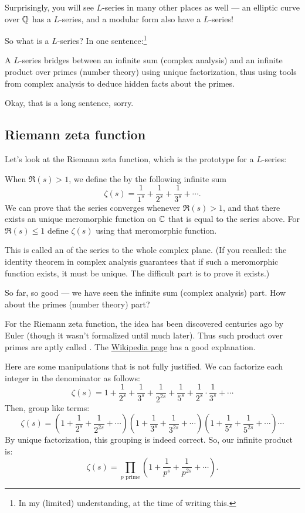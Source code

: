 Surprisingly, you will see $L$-series in many other places as well --- an elliptic curve over $\mathbb Q$
has a $L$-series, and a modular form also have a $L$-series!

So what is a $L$-series? In one sentence:\footnote{In my (limited) understanding, at the time of
writing this.}
\begin{moral}
	A $L$-series bridges between an infinite sum (complex analysis)
	and an infinite product over primes (number theory)
	using unique factorization,
	thus using tools from complex analysis to deduce hidden facts about the primes.
\end{moral}

Okay, that is a long sentence, sorry.

\subsection{Riemann zeta function}

Let's look at the Riemann zeta function, which is the prototype for a $L$-series:

\begin{definition}
	When $\Re(s) > 1$, we define the  by the following infinite sum
	\[ \zeta(s) = \frac{1}{1^s} + \frac{1}{2^s} + \frac{1}{3^s} + \cdots. \]
	We can prove that the series converges whenever $\Re(s) > 1$, and that there exists an unique
	meromorphic function on $\mathbb C$ that is equal to the series above.
	For $\Re(s) \leq 1$ define $\zeta(s)$ using that meromorphic function.
\end{definition}

This is called an  of the series to the whole complex plane.
(If you recalled:
the identity theorem in complex analysis guarantees that if such a meromorphic function exists,
it must be unique. The difficult part is to prove it exists.)

So far, so good --- we have seen the infinite sum (complex analysis) part. How about the primes
(number theory) part?

For the Riemann zeta function, the idea has been discovered centuries ago by Euler
(though it wasn't formalized until much later).
Thus such product over primes are aptly called .
The \href{https://en.wikipedia.org/wiki/Divergence_of_the_sum_of_the_reciprocals_of_the_primes}{%
Wikipedia page} has a good explanation.

Here are some manipulations that is not fully justified.
We can factorize each integer in the denominator as follows:
\[ \zeta(s) = 1 + \frac{1}{2^s}
	+ \frac{1}{3^s}
	+ \frac{1}{2^{2s}}
	+ \frac{1}{5^s}
	+ \frac{1}{2^s} \cdot \frac{1}{3^s}
	+ \cdots
\]
Then, group like terms:
\[ \zeta(s) =
	\left(1 + \frac{1}{2^s} + \frac{1}{2^{2s}} + \cdots \right)
	\left(1 + \frac{1}{3^s} + \frac{1}{3^{2s}} + \cdots \right)
	\left(1 + \frac{1}{5^s} + \frac{1}{5^{2s}} + \cdots \right) \cdots
\]
By unique factorization, this grouping is indeed correct.
So, our infinite product is:
\[ \zeta(s) = \prod_{p\text{ prime}} \left(1 + \frac{1}{p^s} + \frac{1}{p^{2s}} + \cdots\right). \]

